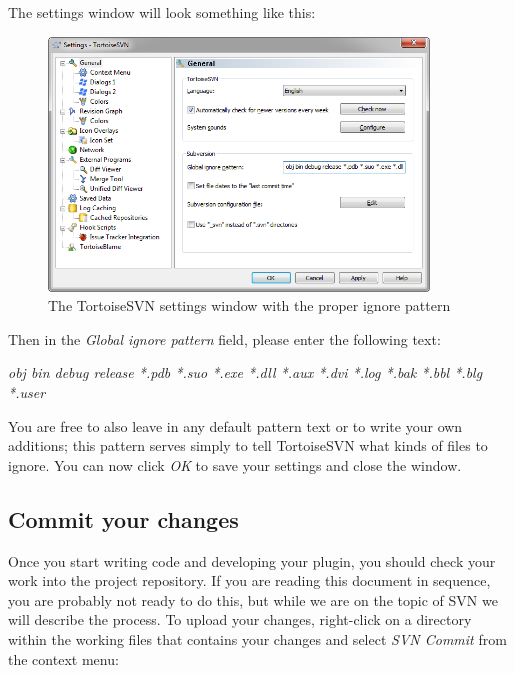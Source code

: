 \noindent The settings window will look something like this:

\begin{figure}[h!]
	\centering
		\includegraphics[width=0.90\textwidth]{figures/tortoise_svn_ignore_patterns.png}
	\caption{The TortoiseSVN settings window with the proper ignore pattern}
	\label{fig:tortoise_svn_ignore_patterns}
\end{figure}

\noindent Then in the \textit{Global ignore pattern} field, please enter the following text:

\begin{center}
\textit{obj bin debug release *.pdb *.suo *.exe *.dll *.aux *.dvi *.log *.bak *.bbl *.blg *.user}
\end{center}

You are free to also leave in any default pattern text or to write your own additions; this pattern serves simply to tell TortoiseSVN what kinds of files to ignore. You can now click \textit{OK} to save your settings and close the window.
\clearpage

\subsection{Commit your changes}
\label{CommitingYourChanges}

Once you start writing code and developing your plugin, you should check your work into the project repository. If you are reading this document in sequence, you are probably not ready to do this, but while we are on the topic of SVN we will describe the process. To upload your changes, right-click on a directory within the working files that contains your changes and select \textit{SVN Commit} from the context menu:

